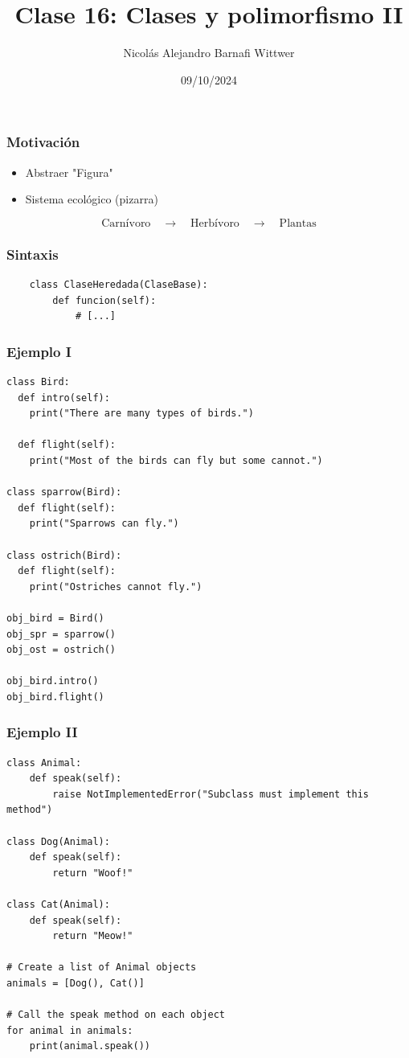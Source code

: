 \documentclass[14pt,aspectratio=169,xcolor=dvipsnames]{beamer}
\title[short title]{Clase 16: Clases y polimorfismo II}
\subtitle{}
\author[NA Barnafi] {Nicolás Alejandro Barnafi Wittwer}
\institute[UC|CMM] 
{
    Pontificia Universidad Católica de Chile \\
    Centro de Modelamiento Matemático
}
\date{09/10/2024}
\begin{document}
\begin{frame}
    \maketitle
\end{frame}
\begin{frame}\frametitle{Motivación}
    \begin{itemize}
        \item Abstraer "Figura"
        \item Sistema ecológico (pizarra)
    \end{itemize}
    $$ \text{Carnívoro}\quad\to\quad\text{Herbívoro}\quad\to\quad\text{Plantas} $$
\end{frame}
\begin{frame}[fragile]\frametitle{Sintaxis}
    \begin{verbatim}
    class ClaseHeredada(ClaseBase):
        def funcion(self):
            # [...]
    \end{verbatim}
\end{frame}
\begin{frame}[fragile]\frametitle{Ejemplo I}
    \begin{verbatim}
class Bird:
  def intro(self):
    print("There are many types of birds.")
    
  def flight(self):
    print("Most of the birds can fly but some cannot.")
  
class sparrow(Bird):
  def flight(self):
    print("Sparrows can fly.")
    
class ostrich(Bird):
  def flight(self):
    print("Ostriches cannot fly.")
    
obj_bird = Bird()
obj_spr = sparrow()
obj_ost = ostrich()

obj_bird.intro()
obj_bird.flight()
    \end{verbatim}
\end{frame}
\begin{frame}[fragile]\frametitle{Ejemplo II}
    \begin{verbatim}
class Animal:
    def speak(self):
        raise NotImplementedError("Subclass must implement this method")

class Dog(Animal):
    def speak(self):
        return "Woof!"

class Cat(Animal):
    def speak(self):
        return "Meow!"

# Create a list of Animal objects
animals = [Dog(), Cat()]

# Call the speak method on each object
for animal in animals:
    print(animal.speak())
    \end{verbatim}
\end{frame}
\end{document}
